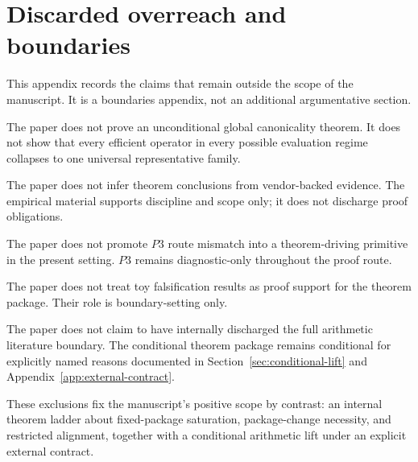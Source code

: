 \section{Discarded overreach and boundaries}\label{app:boundaries}

This appendix records the claims that remain outside the scope of the manuscript. It is a boundaries appendix, not an additional argumentative section.

The paper does not prove an unconditional global canonicality theorem. It does not show that every efficient operator in every possible evaluation regime collapses to one universal representative family.

The paper does not infer theorem conclusions from vendor-backed evidence. The empirical material supports discipline and scope only; it does not discharge proof obligations.

The paper does not promote \(P3\) route mismatch into a theorem-driving primitive in the present setting. \(P3\) remains diagnostic-only throughout the proof route.

The paper does not treat toy falsification results as proof support for the theorem package. Their role is boundary-setting only.

The paper does not claim to have internally discharged the full arithmetic literature boundary. The conditional theorem package remains conditional for explicitly named reasons documented in Section~\ref{sec:conditional-lift} and Appendix~\ref{app:external-contract}.

These exclusions fix the manuscript's positive scope by contrast: an internal theorem ladder about fixed-package saturation, package-change necessity, and restricted alignment, together with a conditional arithmetic lift under an explicit external contract.
